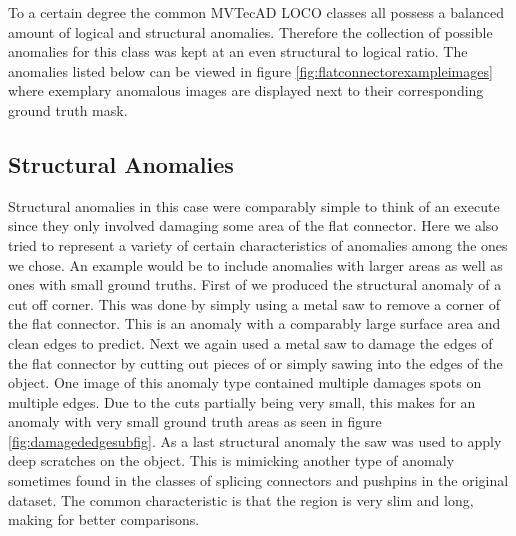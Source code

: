To a certain degree the common MVTecAD LOCO classes all possess a balanced amount of logical and structural anomalies. Therefore the collection of possible anomalies for this class was kept at an even structural 
to logical ratio. The anomalies listed below can be viewed in figure \ref{fig:flatconnectorexampleimages} where exemplary anomalous images are displayed next to their corresponding ground truth mask.

\subsection{Structural Anomalies}
Structural anomalies in this case were comparably simple to think of an execute since they only involved damaging some area of the flat connector. Here we also tried to represent a variety of 
certain characteristics of anomalies among the ones we chose. An example would be to include anomalies with larger areas as well as ones with small ground truths.\newline
First of we produced the structural anomaly of a cut off corner. This was done by simply using a metal saw to remove a corner of the flat connector. This is an anomaly with a comparably large 
surface area and clean edges to predict. Next we again used a metal saw to damage the edges of the flat connector by cutting out pieces of or simply sawing into the edges of the object. One image 
of this anomaly type contained multiple damages spots on multiple edges. Due to the cuts partially being very small, this makes for an anomaly with very small ground truth areas as seen in figure 
\ref{fig:damagededgesubfig}. As a last structural anomaly the saw was used to apply deep scratches on the object. This is mimicking another type of anomaly sometimes found in the classes of splicing connectors and pushpins 
in the original dataset. The common characteristic is that the region is very slim and long, making for better comparisons.

